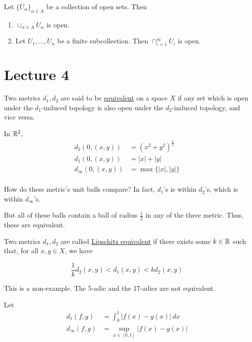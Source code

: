 \documentclass[x11names,reqno,14pt]{extarticle}
\newcommand*{\oo}{{\infty}}
\begin{document}
\thm Let $\{U_\alpha\}_{\alpha\in A}$ be a collection of open sets. Then

\begin{enumerate}
\item $\cup_{\alpha\in A}U_\alpha$ is open. 
\item Let $U_1, \dots, U_n$ be a finite subcollection. Then $\cap_{i=1}^\oo U_i$ is open. 
\end{enumerate}

\proof




\section*{Lecture 4}


Two metrics $d_1, d_2$ are said to be \underline{equivalent} on a space $X$ if any set which is open under the $d_1$-induced topology is also open under the $d_2$-induced topology, and vice versa. 

\exm 

In $\mathbb{R}^2$, 
\begin{align*}
d_2(0, (x, y)) & = (x^2 + y^2)^{\frac{1}{2}}\\
d_1(0, (x, y)) & = |x| + |y| \\
d_{\infty}(0, (x, y)) & = \max\{|x|, |y|\} \\
\end{align*}

How do these metric's unit balls compare? In fact, $d_1$'s is within $d_2$'s, which is within $d_{\oo}$'s.

But all of these balls contain a ball of radius $\frac{1}{2}$ in any of the three metric. Thus, these are equivalent. 


Two metrics $d_1, d_2$ are called \underline{Lipschitz equivalent} if there exists some $k \in \mathbb{R}$ such that, for all $x, y \in X$, we have

\[
\frac{1}{k}d_2(x, y) 
< d_1(x, y) < kd_2(x, y)
\]

\exm

This is a non-example. The 5-adic and the 17-adics are not equivalent. 

\exm

Let 
\begin{align*}
d_1(f, g) & = \int_0^1|f(x) - g(x)|\,dx \\
d_\oo(f, g) & = \sup_{x\in[0, 1]}|f(x) - g(x)| \\
\end{align*}
\end{document}
